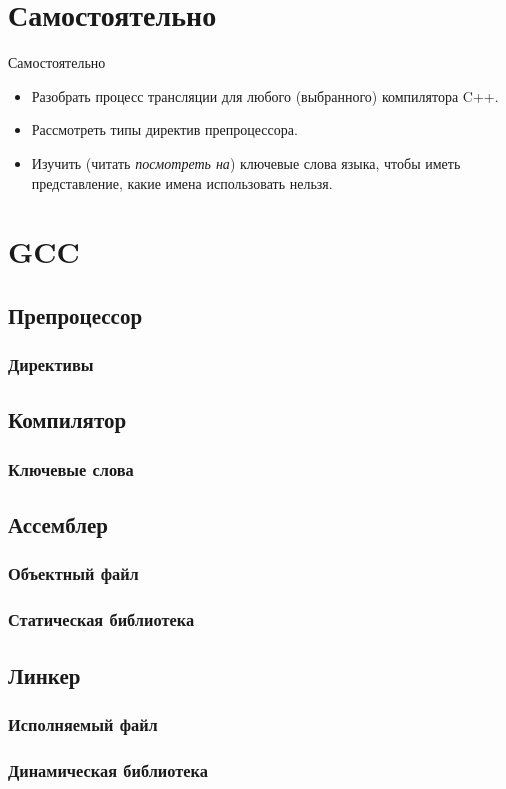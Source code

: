 \documentclass[xetex,mathserif,serif,10pt]{beamer}
\begin{document}
    \section{Самостоятельно}
    \begin{frame}{Самостоятельно}
        \begin{itemize}
            \item Разобрать процесс трансляции для любого (выбранного) компилятора C++.
            \item Рассмотреть типы директив препроцессора.
            \item Изучить (читать \textit{посмотреть на}) ключевые слова языка,
                чтобы иметь представление, какие имена использовать нельзя.
        \end{itemize}
    \end{frame}
    \section{GCC}
    \subsection{Препроцессор}
    \subsubsection{Директивы}
    \subsection{Компилятор}
    \subsubsection{Ключевые слова}
    \subsection{Ассемблер}
    \subsubsection{Объектный файл}
    \subsubsection{Статическая библиотека}
    \subsection{Линкер}
    \subsubsection{Исполняемый файл}
    \subsubsection{Динамическая библиотека}

\end{document}
